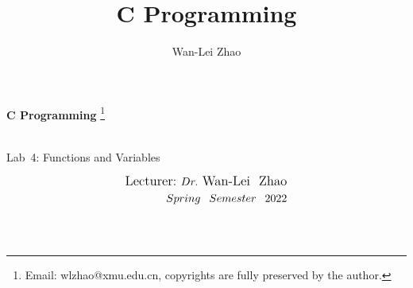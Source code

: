 \documentclass[t]{beamer}
\title{C Programming}
\author{Wan-Lei Zhao}
\newcommand\blfootnote[1]{
  \begingroup
  \renewcommand\thefootnote{}\footnote{#1}
  \addtocounter{footnote}{-1}
  \endgroup
}
\begin{document}
\begin{frame}
   \begin{center}
    \vspace{24pt}
    \Huge\textbf{C Programming}\blfootnote{Email: wlzhao@xmu.edu.cn, copyrights are fully preserved by the author.}\\
     \Huge{\mbox{Lab 4:} Functions and Variables}
    \vspace{36pt}
  \end{center}
  \begin{align*}
   \vspace{18pt}
      \large{\mbox{Lecturer:}~Dr.~\mbox{Wan-Lei~~Zhao}} \\
      \large{Spring~~Semester~~2022} \\
   \vspace{30pt}
  \end{align*}
\end{frame}



\section{}
\end{document}
